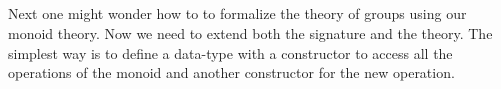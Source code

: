 \begin{code}
\noindent \>[0]\AgdaSpace{}%
\AgdaSymbol{=}\AgdaSpace{}%
\AgdaSpace{}%
\AgdaSymbol{(}\AgdaSpace{}%
\AgdaSpace{}%
\AgdaSymbol{)}\AgdaSpace{}%
\AgdaSpace{}%
\AgdaSymbol{(}\AgdaSpace{}%
\AgdaSpace{}%
\AgdaSymbol{)}\<%
\\%
\\[\AgdaEmptyExtraSkip]%
\>[0]\AgdaSpace{}%
\AgdaSymbol{:}\AgdaSpace{}%
\AgdaSpace{}%
\AgdaSpace{}%
\AgdaSymbol{(}\AgdaSpace{}%
\AgdaSpace{}%
\AgdaSpace{}%
\AgdaSpace{}%
\AgdaSpace{}%
\AgdaSpace{}%
\AgdaSpace{}%
\AgdaSpace{}%
\AgdaInductiveConstructor{[]}\AgdaSymbol{)}\<%
\\%
\>[0]\AgdaSpace{}%
\AgdaSymbol{=}\AgdaSpace{}%
\AgdaSpace{}%
\AgdaSpace{}%
\<%
\\
\end{code}

Next one might wonder how to to formalize the theory of groups using
our monoid theory. Now we need to extend both the signature and the
theory. The simplest way is to define a data-type with a constructor
to access all the operations of the monoid and another constructor for
the new operation.

